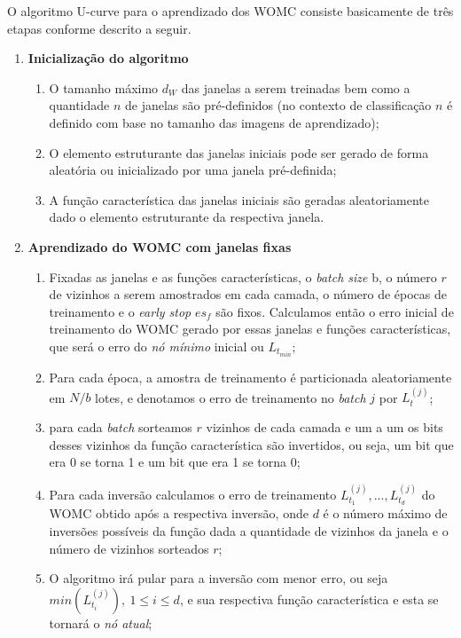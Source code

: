 O algoritmo U-curve para o aprendizado dos WOMC consiste basicamente de três etapas conforme descrito a seguir.

\begin{enumerate}
    \item \textbf{Inicialização do algoritmo} 
    \begin{enumerate}
        \item O tamanho máximo $d_{W}$ das janelas a serem treinadas bem como a quantidade $n$ de janelas são pré-definidos (no contexto de classificação $n$ é definido com base no tamanho das imagens de aprendizado);
        \item O elemento estruturante das janelas iniciais pode ser gerado de forma aleatória ou inicializado por uma janela pré-definida;
        \item A função característica das janelas iniciais são geradas aleatoriamente dado o elemento estruturante da respectiva janela.
    \end{enumerate}
    \item \textbf{Aprendizado do WOMC com janelas fixas}
    \begin{enumerate}
        \item Fixadas as janelas e as funções características, o \textit{batch size} b, o número $r$ de vizinhos a serem amostrados em cada camada, o número de épocas de treinamento e o \textit{early stop} $es_f$ são fixos. Calculamos então o erro inicial de treinamento do WOMC gerado por essas janelas e funções características, que será o erro do \textit{nó mínimo} inicial ou $L_{t_{min}}$;
        \item Para cada época, a amostra de treinamento é particionada aleatoriamente em $N/b$ lotes, e denotamos o erro de treinamento no \textit{batch} $j$ por $L_{t}^{(j)}$;
        \item para cada \textit{batch} sorteamos $r$ vizinhos de cada camada e um a um os bits desses vizinhos da função característica são invertidos, ou seja, um bit que era 0 se torna 1 e um bit que era 1 se torna 0;
        \item Para cada inversão calculamos o erro de treinamento $L_{t_{1}}^{(j)}, ..., L_{t_{d}}^{(j)}$ do WOMC obtido após a respectiva inversão, onde $d$ é o número máximo de inversões possíveis da função dada a quantidade de vizinhos da janela e o número de vizinhos sorteados $r$; 
        \item O algoritmo irá pular para a inversão com menor erro, ou seja $min \left(L_{t_{i}}^{(j)} \right), \ 1 \leq i \leq d$, e sua respectiva função característica e esta se tornará o \textit{nó atual};

\end{enumerate}
\end{enumerate}
